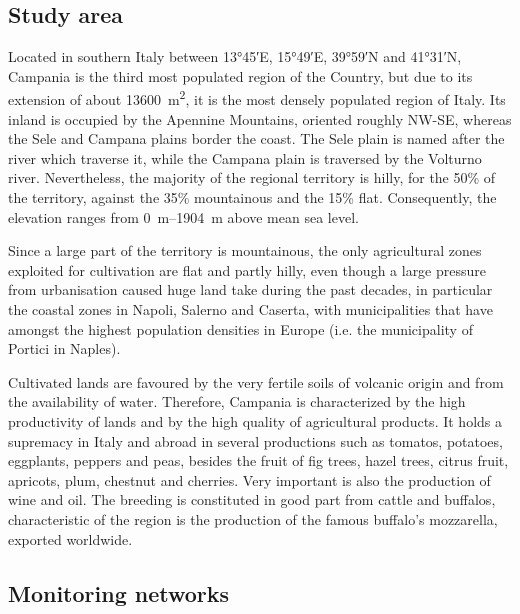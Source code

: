 \documentclass[authoryear,preprint,review,12pt]{elsarticle}
\begin{document}
\subsection{Study area}\label{sec:StudyArea}
Located in southern Italy between \ang{13;45;}E, \ang{15;49;}E, \ang{39;59;}N and \ang{41;31;}N, Campania is the third most populated region of the Country, but due to its extension of about \SI{13600}{\metre\squared}, it is the most densely populated region of Italy.
Its inland is occupied by the Apennine Mountains, oriented roughly NW-SE, whereas the Sele and Campana plains border the coast.
The Sele plain is named after the river which traverse it, while the Campana plain is traversed by the Volturno river.
Nevertheless, the majority of the regional territory is hilly, for the 50\% of the territory, against the 35\% mountainous and the 15\% flat.
Consequently, the elevation ranges from \SIrange{0}{1904}{\metre} above mean sea level.

Since a large part of the territory is mountainous, the only agricultural zones exploited for cultivation are flat and partly hilly, even though a large pressure from urbanisation caused huge land take during the past decades, in particular  the coastal zones in Napoli, Salerno and Caserta, with municipalities that have amongst the highest population densities in Europe (i.e. the municipality of Portici in Naples).

Cultivated lands are favoured by the very fertile soils of volcanic origin and from the availability of water. 
Therefore, Campania is characterized by the high productivity of lands and by the high quality of agricultural products.
It holds a supremacy in Italy and abroad in several productions such as tomatos, potatoes, eggplants, peppers and peas, besides the fruit of fig trees, hazel trees, citrus fruit, apricots, plum, chestnut and cherries.
Very important is also the production of wine and oil.
The breeding is constituted in good part from cattle and buffalos, characteristic of the region is the production of the famous buffalo's mozzarella, exported worldwide.


\subsection{Monitoring networks}
\end{document}
